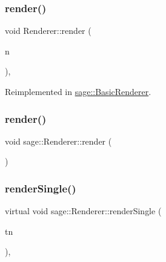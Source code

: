 \mbox{\label{classsage_1_1Renderer_a213548aab22256923579dcfda01b12ba}} 
\subsubsection{\texorpdfstring{render()}{render()}\hspace{0.1cm}{\footnotesize\ttfamily [2/3]}}
{\footnotesize\ttfamily void Renderer\+::render (\begin{DoxyParamCaption}\item[{\mbox{\hyperlink{classsage_1_1Node}{Node}} \&}]{n }\end{DoxyParamCaption})\hspace{0.3cm}{\ttfamily [protected]}, {\ttfamily [virtual]}}



Reimplemented in \mbox{\hyperlink{classsage_1_1BasicRenderer_a098449e7b2b967968baaec113b53d653}{sage\+::\+Basic\+Renderer}}.

\mbox{\label{classsage_1_1Renderer_a26b3671c3df207eaf2620fdc06a2610e}} 
\subsubsection{\texorpdfstring{render()}{render()}\hspace{0.1cm}{\footnotesize\ttfamily [3/3]}}
{\footnotesize\ttfamily void sage\+::\+Renderer\+::render (\begin{DoxyParamCaption}{ }\end{DoxyParamCaption})\hspace{0.3cm}{\ttfamily [protected]}}

\mbox{\label{classsage_1_1Renderer_aa79cfd587fa85ae8ea7ccf465825d212}} 
\subsubsection{\texorpdfstring{renderSingle()}{renderSingle()}\hspace{0.1cm}{\footnotesize\ttfamily [1/2]}}
{\footnotesize\ttfamily virtual void sage\+::\+Renderer\+::render\+Single (\begin{DoxyParamCaption}\item[{\mbox{\hyperlink{classsage_1_1TexturedNode}{Textured\+Node}} \&}]{tn }\end{DoxyParamCaption})\hspace{0.3cm}{\ttfamily [protected]}, {}}



